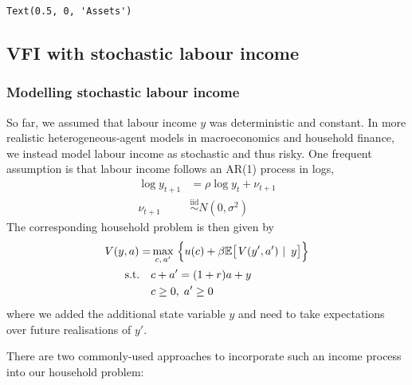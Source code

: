 \documentclass{scrartcl}
\makeatletter
\newcommand{\boxspacing}{\kern\kvtcb@left@rule\kern\kvtcb@boxsep}
\newcommand{\prompt}[4]{
        {\ttfamily\llap{{\color{#2}[#3]:\hspace{3pt}#4}}\vspace{-\baselineskip}}
    }
\makeatother
\begin{document}
            \begin{tcolorbox}[breakable, size=fbox, boxrule=.5pt, pad at break*=1mm, opacityfill=0]
\prompt{Out}{outcolor}{11}{\boxspacing}
\begin{Verbatim}[commandchars=\\\{\}]
Text(0.5, 0, 'Assets')
\end{Verbatim}
\end{tcolorbox}
        
    \begin{center}
    \end{center}
    

\hypertarget{vfi-with-stochastic-labour-income}{%
\subsection{VFI with stochastic labour
income}\label{vfi-with-stochastic-labour-income}}

\hypertarget{modelling-stochastic-labour-income}{%
\subsubsection{Modelling stochastic labour
income}\label{modelling-stochastic-labour-income}}

So far, we assumed that labour income \(y\) was deterministic and
constant. In more realistic heterogeneous-agent models in macroeconomics
and household finance, we instead model labour income as stochastic and
thus risky. One frequent assumption is that labour income follows an
AR(1) process in logs, \ie \[
\begin{aligned}
    \log y_{t+1} &= \rho \log y_t + \nu_{t+1} \\
    \nu_{t+1} &\stackrel{\text{iid}}{\sim} N(0, \sigma^2)
\end{aligned}
\] The corresponding household problem is then given by \[
\begin{aligned}
V(y,a) = &\max_{c,\,a'}~\Bigl\{ u(c)
    + \beta \mathbb{E}\bigl[\left.V(y',a')~\right|~ y\bigr] \Bigr\} \\
    \text{s.t.} \quad &c + a' = (1+r)a  + y \\
    & c \geq 0,\; a' \geq 0
\end{aligned}
\] where we added the additional state variable \(y\) and need to take
expectations over future realisations of \(y'\).

There are two commonly-used approaches to incorporate such an income
process into our household problem:
\end{document}
